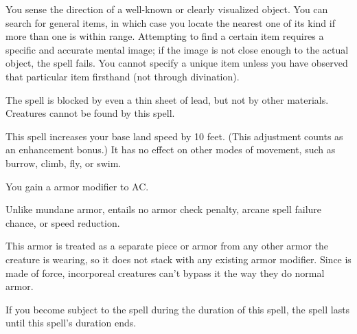 \spellrng{\rngfar}
\begin{spelleffect}
  You sense the direction of a well-known or clearly visualized object. You can search for general items, in which case you locate the nearest one of its kind if more than one is within range. Attempting to find a certain item requires a specific and accurate mental image; if the image is not close enough to the actual object, the spell fails. You cannot specify a unique item unless you have observed that particular item firsthand (not through divination).
\end{spelleffect}
\begin{spellnotes}
  The spell is blocked by even a thin sheet of lead, but not by other materials. Creatures cannot be found by this spell.
\end{spellnotes}

\spellrng{\rngpers}
\begin{spelleffect}
  This spell increases your base land speed by 10 feet. (This adjustment counts as an enhancement bonus.) It has no effect on other modes of movement, such as burrow, climb, fly, or swim.
\end{spelleffect}

\begin{comment}
\subsubsection{M}
\end{comment}

\begin{spelleffect}
  You gain a  armor modifier to AC. \bonusscalingdescription
  \par Unlike mundane armor,  entails no armor check penalty, arcane spell failure chance, or speed reduction.
\end{spelleffect}
\begin{spellnotes}
  This armor is treated as a separate piece or armor from any other armor the creature is wearing, so it does not stack with any existing armor modifier. Since  is made of force, incorporeal creatures can't bypass it the way they do normal armor.
  
  If you become subject to the  spell during the duration of this spell, the  spell lasts until this spell's duration ends.
\end{spellnotes}

